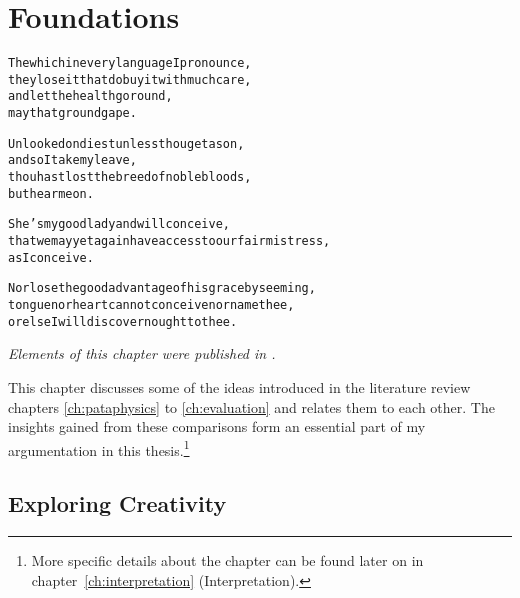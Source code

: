 
\chapter{Foundations}
\label{ch:foundations}

\startcontents[chapters]

\vfill

\begin{alltt}\sffamily
The which in every language I pronounce,
they lose it that do buy it with much care,
and let the health go round,
may that ground gape.

Unlooked on diest unless thou get a son,
and so I take my leave,
thou hast lost the breed of noble bloods,
but hear me on.

She's my good lady and will conceive,  
that we may yet again have access to our fair mistress,
as I conceive.

Nor lose the good advantage of his grace by seeming,
tongue nor heart cannot conceive nor name thee,
or else I will discover nought to thee.
\end{alltt}

\newpage
\minicontents
\spirals

\emph{Elements of this chapter were published in \autocite{Hugill2013d}.}

\spirals

This chapter discusses some of the ideas introduced in the literature review chapters \ref{ch:pataphysics} to \ref{ch:evaluation} and relates them to each other. The insights gained from these comparisons form an essential part of my argumentation in this thesis.\footnote{More specific details about the  chapter can be found later on in chapter~\ref{ch:interpretation} (Interpretation).}


\section{Exploring Creativity}



